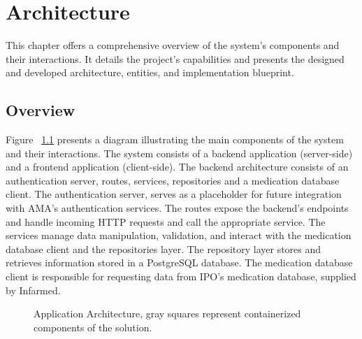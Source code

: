 %
%
\chapter{Architecture} \label{cap:architecture}

This chapter offers a comprehensive overview of the system's components and their interactions. It details the project's capabilities and presents the designed and developed architecture, entities, and implementation blueprint.

\section{Overview}

Figure ~\ref{fig:architecture} presents a diagram illustrating the main components of the system and their interactions. The system consists of a backend application (server-side) and a frontend application (client-side).
The backend architecture consists of an authentication server, routes, services, repositories and a medication database client.
The authentication server,  serves as a placeholder for future integration with AMA's authentication services.
The routes expose the backend's endpoints and handle incoming HTTP requests and call the appropriate service.
The services manage data manipulation, validation, and interact with the medication database client and the repositories layer.
The repository layer stores and retrieves information stored in a PostgreSQL database.
The medication database client is responsible for requesting data from IPO's medication database, supplied by Infarmed.


\begin{figure}[H]
	\begin{center}
	\end{center}
	\caption{Application Architecture, gray squares represent containerized components of the solution.}\label{fig:architecture}
\end{figure}


